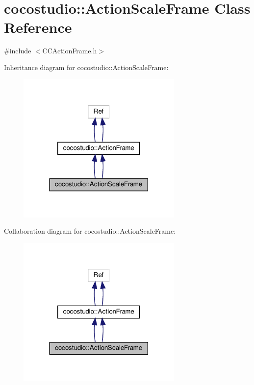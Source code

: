 \hypertarget{classcocostudio_1_1ActionScaleFrame}{}\section{cocostudio\+:\+:Action\+Scale\+Frame Class Reference}
\label{classcocostudio_1_1ActionScaleFrame}


{\ttfamily \#include $<$C\+C\+Action\+Frame.\+h$>$}



Inheritance diagram for cocostudio\+:\+:Action\+Scale\+Frame\+:
\nopagebreak
\begin{figure}[H]
\begin{center}
\leavevmode
\includegraphics[width=230pt]{classcocostudio_1_1ActionScaleFrame__inherit__graph}
\end{center}
\end{figure}


Collaboration diagram for cocostudio\+:\+:Action\+Scale\+Frame\+:
\nopagebreak
\begin{figure}[H]
\begin{center}
\leavevmode
\includegraphics[width=230pt]{classcocostudio_1_1ActionScaleFrame__coll__graph}
\end{center}
\end{figure}
